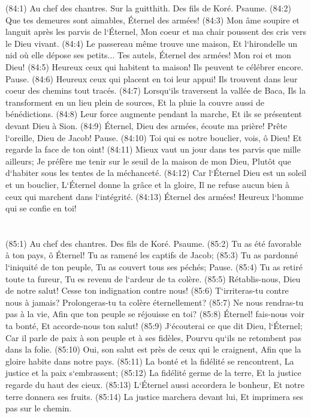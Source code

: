 \verse (84:1) Au chef des chantres. Sur la guitthith. Des fils de Koré. Psaume. (84:2) Que tes demeures sont aimables, Éternel des armées! 
\verse (84:3) Mon âme soupire et languit après les parvis de l`Éternel, Mon coeur et ma chair poussent des cris vers le Dieu vivant. 
\verse (84:4) Le passereau même trouve une maison, Et l`hirondelle un nid où elle dépose ses petits... Tes autels, Éternel des armées! Mon roi et mon Dieu! 
\verse (84:5) Heureux ceux qui habitent ta maison! Ils peuvent te célébrer encore. Pause. 
\verse (84:6) Heureux ceux qui placent en toi leur appui! Ils trouvent dans leur coeur des chemins tout tracés. 
\verse (84:7) Lorsqu`ils traversent la vallée de Baca, Ils la transforment en un lieu plein de sources, Et la pluie la couvre aussi de bénédictions. 
\verse (84:8) Leur force augmente pendant la marche, Et ils se présentent devant Dieu à Sion. 
\verse (84:9) Éternel, Dieu des armées, écoute ma prière! Prête l`oreille, Dieu de Jacob! Pause. 
\verse (84:10) Toi qui es notre bouclier, vois, ô Dieu! Et regarde la face de ton oint! 
\verse (84:11) Mieux vaut un jour dans tes parvis que mille ailleurs; Je préfère me tenir sur le seuil de la maison de mon Dieu, Plutôt que d`habiter sous les tentes de la méchanceté. 
\verse (84:12) Car l`Éternel Dieu est un soleil et un bouclier, L`Éternel donne la grâce et la gloire, Il ne refuse aucun bien à ceux qui marchent dans l`intégrité. 
\verse (84:13) Éternel des armées! Heureux l`homme qui se confie en toi! 

\chapter{}

\verse (85:1) Au chef des chantres. Des fils de Koré. Psaume. (85:2) Tu as été favorable à ton pays, ô Éternel! Tu as ramené les captifs de Jacob; 
\verse (85:3) Tu as pardonné l`iniquité de ton peuple, Tu as couvert tous ses péchés; Pause. 
\verse (85:4) Tu as retiré toute ta fureur, Tu es revenu de l`ardeur de ta colère. 
\verse (85:5) Rétablis-nous, Dieu de notre salut! Cesse ton indignation contre nous! 
\verse (85:6) T`irriteras-tu contre nous à jamais? Prolongeras-tu ta colère éternellement? 
\verse (85:7) Ne nous rendras-tu pas à la vie, Afin que ton peuple se réjouisse en toi? 
\verse (85:8) Éternel! fais-nous voir ta bonté, Et accorde-nous ton salut! 
\verse (85:9) J`écouterai ce que dit Dieu, l`Éternel; Car il parle de paix à son peuple et à ses fidèles, Pourvu qu`ils ne retombent pas dans la folie. 
\verse (85:10) Oui, son salut est près de ceux qui le craignent, Afin que la gloire habite dans notre pays. 
\verse (85:11) La bonté et la fidélité se rencontrent, La justice et la paix s`embrassent; 
\verse (85:12) La fidélité germe de la terre, Et la justice regarde du haut des cieux. 
\verse (85:13) L`Éternel aussi accordera le bonheur, Et notre terre donnera ses fruits. 
\verse (85:14) La justice marchera devant lui, Et imprimera ses pas sur le chemin. 

